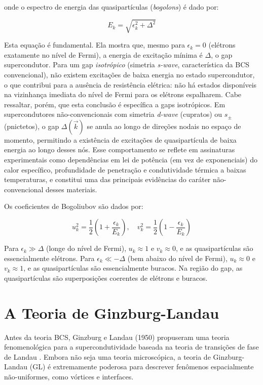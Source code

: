 \documentclass[12pt, a4paper, oneside]{report}
\begin{document}
onde o espectro de energia das quasipartículas (\textit{bogolons}) é dado por:

\begin{equation}
    E_k = \sqrt{\epsilon_k^2 + \Delta^2}
\end{equation}

Esta equação é fundamental. Ela mostra que, mesmo para $\epsilon_k = 0$ (elétrons exatamente no nível de Fermi), a energia de excitação mínima é $\Delta$, o gap supercondutor. Para um gap \emph{isotrópico} (simetria \textit{s-wave}, característica da BCS convencional), não existem excitações de baixa energia no estado supercondutor, o que contribui para a ausência de resistência elétrica: não há estados disponíveis na vizinhança imediata do nível de Fermi para os elétrons espalharem. Cabe ressaltar, porém, que esta conclusão é específica a gaps isotrópicos. Em supercondutores não-convencionais com simetria \textit{d-wave} (cupratos) ou $s_\pm$ (pnictetos), o gap $\Delta(\vec{k})$ se anula ao longo de direções nodais no espaço de momento, permitindo a existência de excitações de quasipartícula de baixa energia ao longo desses nós. Esse comportamento se reflete em assinaturas experimentais como dependências em lei de potência (em vez de exponenciais) do calor específico, profundidade de penetração e condutividade térmica a baixas temperaturas, e constitui uma das principais evidências do caráter não-convencional desses materiais.

Os coeficientes de Bogoliubov são dados por:

\begin{equation}
    u_k^2 = \frac{1}{2} \left( 1 + \frac{\epsilon_k}{E_k} \right), \quad v_k^2 = \frac{1}{2} \left( 1 - \frac{\epsilon_k}{E_k} \right)
\end{equation}

Para $\epsilon_k \gg \Delta$ (longe do nível de Fermi), $u_k \approx 1$ e $v_k \approx 0$, e as quasipartículas são essencialmente elétrons. Para $\epsilon_k \ll -\Delta$ (bem abaixo do nível de Fermi), $u_k \approx 0$ e $v_k \approx 1$, e as quasipartículas são essencialmente buracos. Na região do gap, as quasipartículas são superposições coerentes de elétrons e buracos.

\section{A Teoria de Ginzburg-Landau}

Antes da teoria BCS, Ginzburg e Landau (1950) propuseram uma teoria fenomenológica para a supercondutividade baseada na teoria de transições de fase de Landau \cite{ginzburg1950}. Embora não seja uma teoria microscópica, a teoria de Ginzburg-Landau (GL) é extremamente poderosa para descrever fenômenos espacialmente não-uniformes, como vórtices e interfaces.
\end{document}
